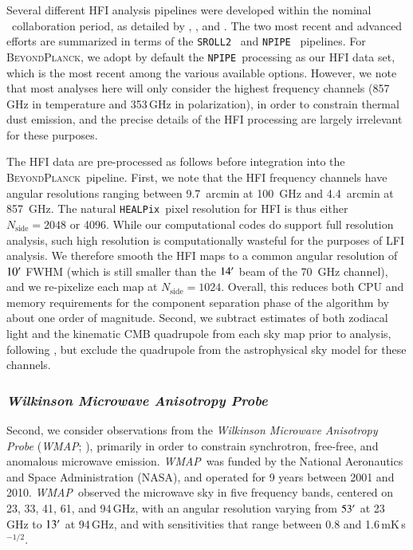 \documentclass[onecolumn]{aa}
\def\WMAP{\emph{WMAP}}
\newcommand{\BP}{\textsc{BeyondPlanck}}
\newcommand{\npipe}[0]{\texttt{NPIPE}}
\newcommand{\srollTwo}[0]{\texttt{SROLL2}}
\newcommand{\HEALPix}[0]{\texttt{HEALPix}}
\begin{document}
Several different HFI analysis pipelines were developed within the
nominal \Planck\ collaboration period, as detailed by
\citet{planck2013-p03}, \citet{planck2014-a08}, and
\citet{planck2016-l03}. The two most recent and advanced efforts are
summarized in terms of the \srollTwo\ \citep{delouis:2019} and
\npipe\ \citep{planck2020-LVII} pipelines. For \BP, we adopt by default the
\npipe\ processing as our HFI data set, which is the most recent among
the various available options. However, we note that most analyses here
will only consider the highest frequency channels (857\,GHz in
temperature and 353\,GHz in polarization), in order to constrain
thermal dust emission, and the precise details of the HFI processing
are largely irrelevant for these purposes.

The HFI data are pre-processed as follows before integration into the
\BP\ pipeline. First, we note that the HFI frequency channels have
angular resolutions ranging between 9.7~arcmin at 100~GHz and
4.4~arcmin at 857~GHz. The natural \HEALPix\ pixel resolution for HFI
is thus either $N_{\mathrm{side}}=2048$ or 4096. While our
computational codes do support full resolution analysis, such high
resolution is computationally wasteful for the purposes of LFI
analysis. We therefore smooth the HFI maps to a common angular
resolution of $10\arcm$ FWHM (which is still smaller than the
$14\arcm$ beam of the 70~GHz channel), and we re-pixelize each map at
$N_{\mathrm{side}}=1024$. Overall, this reduces both CPU and memory
requirements for the component separation phase of the algorithm by
about one order of magnitude. Second, we subtract estimates of both
zodiacal light and the kinematic CMB quadrupole from each sky map
prior to analysis, following \citet{planck2020-LVII}, but exclude the
quadrupole from the astrophysical sky model for these channels.


\subsubsection{\emph{Wilkinson Microwave Anisotropy Probe}}

Second, we consider observations from the \emph{Wilkinson Microwave
  Anisotropy Probe} (\WMAP; \citealp{bennett2012}), primarily in order
to constrain synchrotron, free-free, and anomalous microwave
emission. \WMAP\ was funded by the National Aeronautics and Space
Administration (NASA), and operated for 9 years between 2001 and
2010. \WMAP\ observed the microwave sky in five frequency bands,
centered on 23, 33, 41, 61, and 94\,GHz, with an angular resolution
varying from $53\arcm$ at 23\,GHz to $13\arcm$ at 94\,GHz, and with
sensitivities that range between 0.8 and 1.6\,mK\,s$^{-1/2}$.
\end{document}
